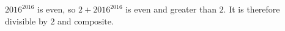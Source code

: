 $2016^{2016}$ is even, so $2+2016^{2016}$ is even and greater than $2$. It is therefore divisible by $2$ and $\boxed{\text{composite}}$.
